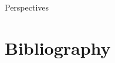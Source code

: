 \documentclass[xcolor={usenames,dvipsnames},hyperref={pdfusetitle}]{beamer}
\begin{document}
\begin{frame}{Perspectives}
\end{frame}

\section*{Bibliography}
%




\end{document}
